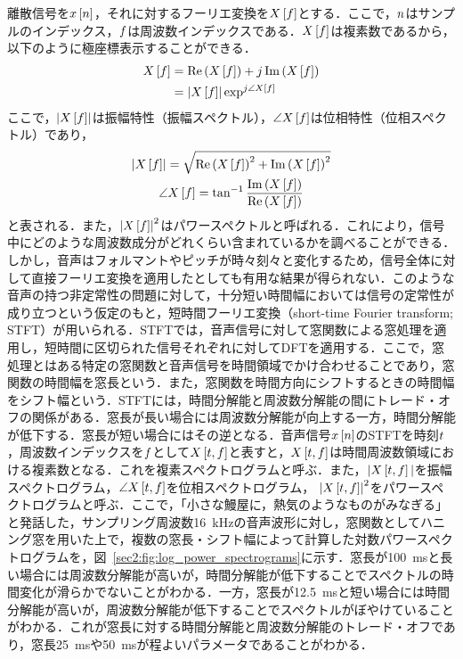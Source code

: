 離散信号を$x\left[n\right]$，それに対するフーリエ変換を$X\left[f\right]$とする．ここで，$n$はサンプルのインデックス，$f$は周波数インデックスである．$X\left[f\right]$は複素数であるから，以下のように極座標表示することができる．
\begin{align}
    X\left[f\right] & = \Re\left(X\left[f\right]\right) + j\Im\left(X\left[f\right]\right)    \\
                       & = \left|X\left[f\right]\right|\exp^{j\angle X\left[f\right]}
\end{align}
ここで，$\left|X\left[f\right]\right|$は振幅特性（振幅スペクトル），$\angle X\left[f\right]$は位相特性（位相スペクトル）であり，
\begin{gather}
    \left|X\left[f\right]\right| = \sqrt{\Re\left(X\left[f\right]\right)^{2} + \Im\left(X\left[f\right]\right)^{2}} \\
    \angle X\left[f\right] = \tan^{-1} \frac{\Im\left(X\left[f\right]\right)}{\Re\left(X\left[f\right]\right)}
\end{gather}
と表される．また，$\left|X\left[f\right]\right|^2$はパワースペクトルと呼ばれる．これにより，信号中にどのような周波数成分がどれくらい含まれているかを調べることができる．しかし，音声はフォルマントやピッチが時々刻々と変化するため，信号全体に対して直接フーリエ変換を適用したとしても有用な結果が得られない．このような音声の持つ非定常性の問題に対して，十分短い時間幅においては信号の定常性が成り立つという仮定のもと，短時間フーリエ変換（short-time Fourier transform; STFT）が用いられる．STFTでは，音声信号に対して窓関数による窓処理を適用し，短時間に区切られた信号それぞれに対してDFTを適用する．ここで，窓処理とはある特定の窓関数と音声信号を時間領域でかけ合わせることであり，窓関数の時間幅を窓長という．また，窓関数を時間方向にシフトするときの時間幅をシフト幅という．STFTには，時間分解能と周波数分解能の間にトレード・オフの関係がある．窓長が長い場合には周波数分解能が向上する一方，時間分解能が低下する．窓長が短い場合にはその逆となる．音声信号$x\left[n\right]$のSTFTを時刻$t$，周波数インデックスを$f$として$X\left[t, f\right]$と表すと，$X\left[t, f\right]$は時間周波数領域における複素数となる．これを複素スペクトログラムと呼ぶ．また，$|X\left[t, f\right]|$を振幅スペクトログラム，$\angle X\left[t, f\right]$を位相スペクトログラム，
$\left|X\left[t, f\right]\right|^{2}$をパワースペクトログラムと呼ぶ．ここで，「小さな鰻屋に，熱気のようなものがみなぎる」と発話した，サンプリング周波数\SI{16}{\kHz}の音声波形に対し，窓関数としてハニング窓を用いた上で，複数の窓長・シフト幅によって計算した対数パワースペクトログラムを，図~\ref{sec2:fig:log_power_spectrograms}に示す．窓長が\SI{100}{\ms}と長い場合には周波数分解能が高いが，時間分解能が低下することでスペクトルの時間変化が滑らかでないことがわかる．一方，窓長が\SI{12.5}{\ms}と短い場合には時間分解能が高いが，周波数分解能が低下することでスペクトルがぼやけていることがわかる．これが窓長に対する時間分解能と周波数分解能のトレード・オフであり，窓長\SI{25}{\ms}や\SI{50}{ms}が程よいパラメータであることがわかる．
